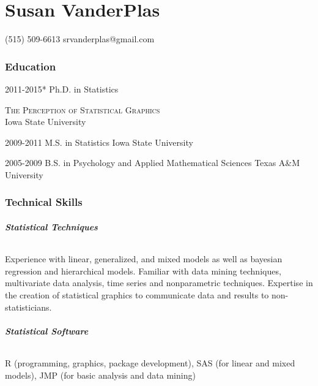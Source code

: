 \documentclass[10pt]{tccv}
\begin{document}
\part{Susan VanderPlas}

    {(515) 509-6613}
    {srvanderplas@gmail.com}
\section{Education}

\begin{yearlist}

\item{2011-2015*}
     {Ph.D. in Statistics}
     {\begin{minipage}{.3125\textwidth}\textsc{\small The Perception of Statistical Graphics}\\ Iowa State University\end{minipage}}

\item{2009-2011}
     {M.S. in Statistics}
     {Iowa State University}

\item{2005-2009}
     {B.S. in Psychology and Applied Mathematical Sciences}
     {Texas A\&M University}

\end{yearlist}

\section{Technical Skills}
\paragraph{\textbf{Statistical Techniques}}
Experience with linear, generalized, and mixed models as well as bayesian regression and hierarchical models. Familiar with data mining techniques, multivariate data analysis, time series and nonparametric techniques. Expertise in the creation of statistical graphics to communicate data and results to non-statisticians.\vspace{-6pt}
\paragraph{\textbf{Statistical Software}}
R (programming, graphics, package development), SAS (for linear and mixed models), JMP (for basic analysis and data mining)\vspace{-6pt}
\end{document}
